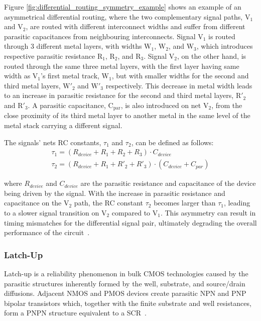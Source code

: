 Figure \ref{fig:differential_routing_symmetry_example} shows an example of an asymmetrical differential routing, where the two complementary signal paths, $\mathrm{V_1}$ and $\mathrm{V_2}$, are routed with different interconnect widths and suffer from different parasitic capacitances from neighbouring interconnects. Signal $\mathrm{V_1}$ is routed through 3 different metal layers, with widths $\mathrm{W_1}$, $\mathrm{W_2}$, and $\mathrm{W_3}$, which introduces respective parasitic resistance $\mathrm{R_1}$, $\mathrm{R_2}$, and $\mathrm{R_3}$. Signal $\mathrm{V_2}$, on the other hand, is routed through the same three metal layers, with the first layer having same width as $\mathrm{V_1}$'s first metal track, $\mathrm{W_1}$, but with smaller widths for the second and third metal layers, $\mathrm{W'_2}$ and $\mathrm{W'_3}$ respectively. This decrease in metal width leads to an increase in parasitic resistance for the second and third metal layers, $\mathrm{R'_2}$ and $\mathrm{R'_3}$. A parasitic capacitance, $\mathrm{C_{par}}$, is also introduced on net $\mathrm{V_2}$, from the close proximity of its third metal layer to another metal in the same level of the metal stack carrying a different signal.

The signals' nets RC constants, $\tau_1$ and $\tau_2$, can be defined as follows:
\begin{align}
    \tau_1 = (R_{device} + R_1 + R_2 + R_3) \cdot C_{device}\\
    \tau_2 = (R_{device} + R_1 + R'_2 + R'_3) \cdot (C_{device} + C_{par})
    \label{eq:asymmetric_tau}
\end{align}

where $R_{device}$ and $C_{device}$ are the parasitic resistance and capacitance of the device being driven by the signal. With the increase in parasitic resistance and capacitance on the $\mathrm{V_2}$ path, the RC constant $\tau_2$ becomes larger than $\tau_1$, leading to a slower signal transition on $\mathrm{V_2}$ compared to $\mathrm{V_1}$. This asymmetry can result in timing mismatches for the differential signal pair, ultimately degrading the overall performance of the circuit~\cite{chen_cml_review_2026, bogatin_SI}.

\subsubsection{Latch-Up}
\label{sec:latchup}
Latch-up is a reliability phenomenon in bulk \ac{CMOS} technologies caused by the parasitic structures inherently formed by the well, substrate, and source/drain diffusions. Adjacent NMOS and PMOS devices create parasitic NPN and PNP bipolar transistors which, together with the finite substrate and well resistances, form a PNPN structure equivalent to a \ac{SCR}~\cite{layout_fundamentals,baker,ndjountche2011_highspeed}.

